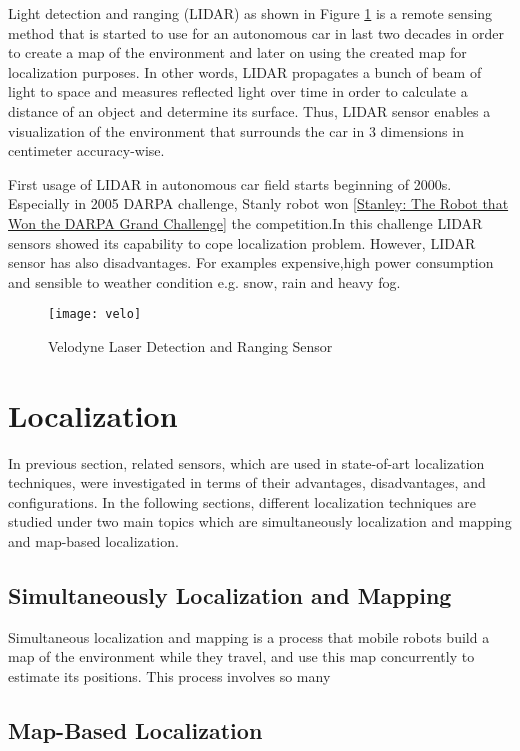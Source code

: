 Light detection and ranging (LIDAR) as shown in Figure \ref{fig:velo} is a remote sensing method 
that is started to use for an autonomous car in last two decades in order to create a map of the environment and later on using the created map for localization purposes. In other words, LIDAR propagates a bunch of beam of light to space and measures reflected light over time in order to calculate a distance of an object and determine its surface. Thus, LIDAR sensor enables a visualization of the environment that surrounds the car in 3 dimensions in centimeter accuracy-wise.
\\ 
\par First usage of LIDAR in autonomous car field starts beginning of 2000s. Especially in 2005 DARPA challenge, Stanly robot won \ref{Stanley: The Robot that Won the DARPA Grand Challenge} the competition.In this challenge LIDAR sensors showed its capability to cope localization problem. However, LIDAR sensor has also disadvantages. For examples expensive,high power consumption and sensible to weather condition e.g. snow, rain and heavy fog. %
\begin{figure}[h]
    \centering
    \texttt{[image: velo]}
    \caption{Velodyne Laser Detection and Ranging Sensor}
    \label{fig:velo}
\end{figure}

\section{Localization}
In previous section, related sensors, which are used in state-of-art localization techniques, were investigated in terms of their advantages, disadvantages, and configurations. In the following sections, different localization techniques are studied under two main topics which are simultaneously localization and mapping and map-based localization.

\subsection{Simultaneously Localization and Mapping}

Simultaneous localization and mapping is a process that mobile robots build a map of the environment while they travel, and use this map concurrently to estimate its positions. This process involves so many 

\subsection{Map-Based Localization}
